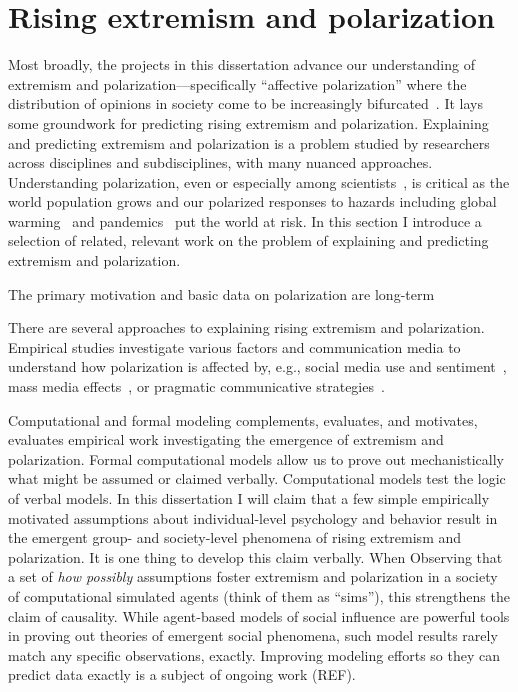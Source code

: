 \documentclass[12pt,letterpaper]{article}
\begin{document}
\section{Rising extremism and polarization}

Most broadly, the projects in this dissertation advance our understanding
of extremism and polarization---specifically ``affective polarization'' where
the distribution of opinions in society come to be increasingly 
bifurcated~\cite{Bramson2016,Iyengar2019}. 
It lays some groundwork for predicting 
rising extremism and polarization. Explaining and predicting 
extremism and polarization is a problem studied by researchers across disciplines
and subdisciplines, with many nuanced approaches. Understanding
polarization, even or especially among scientists~\cite{OConnor2018}, 
is critical as the world population
grows and our polarized responses to hazards 
including global warming~\cite{Cook2016} and pandemics~\cite{Green2020} 
put the world at risk. 
In this section I introduce a selection of related, relevant work on the 
problem of explaining and predicting extremism and polarization.

The primary motivation and basic data on polarization are long-term 


There are several approaches to explaining rising extremism and polarization.
Empirical studies investigate various factors and communication media to understand
how polarization is affected by, e.g., social media use and 
sentiment~\cite{Bail2018}, mass media effects~\cite{Prior2013,Pew2014,Martin2017a}, 
or pragmatic communicative 
strategies~\cite{Charteris-Black2009,Thibodeau2015,Flusberg2017,Flusberg2018,Turner2021a}.


Computational and formal modeling complements, evaluates, and motivates, evaluates 
empirical work investigating the emergence of extremism and polarization.
Formal computational models allow us to prove out mechanistically what might
be assumed or claimed verbally. Computational models test the logic of 
verbal models. In this dissertation I will claim that a few simple empirically
motivated assumptions about individual-level psychology and behavior result
in the emergent group- and society-level phenomena of rising extremism and
polarization. It is one thing to develop this claim verbally. When
Observing that a set of \emph{how possibly} assumptions foster extremism and
polarization in a society of computational simulated agents 
(think of them as ``sims''), this strengthens the claim of causality. While
agent-based models of social influence are powerful tools in proving out 
theories of emergent social phenomena, such model results rarely match any
specific observations, exactly. Improving modeling efforts so they can predict
data exactly is a subject of ongoing work (REF).
\end{document}
